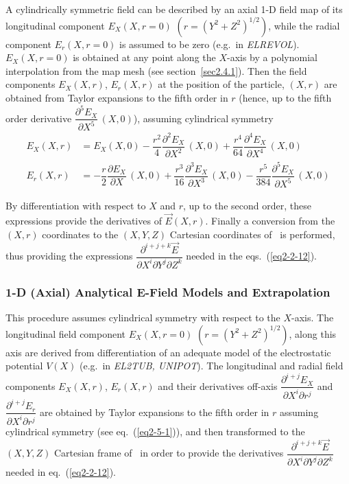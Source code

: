  A cylindrically symmetric field can be described by an 
axial 1-D field map of its longitudinal component $ E_X(X,r=0)$ 
$(r=(Y^2+Z^2)^{1/2})$,  
while the radial component $ E_r(X,r=0) $ is assumed to be zero 
(e.g.~in \textsl{ELREVOL}). $ E_X(X,r=0) $ is obtained at any point along the $ X$-axis by
a polynomial interpolation from the map mesh (see section~\ref{sec2.4.1}). Then the 
field components $ E_X(X,r)$,  $ E_r(X,r) $ at the position of the particle, 
$(X,r) $ are obtained from Taylor expansions to the fifth order in $ r $ (hence, up to 
the fifth order derivative 
$  \dfrac{ \partial^5 E_X }{ \partial X^5}\, (X,0)$),  assuming cylindrical symmetry 
% 
 \begin{equation}
	 \begin{aligned}
		 E_X (X,r)
		   &  =    E_X (X,0) - \dfrac{r^2 }{ 4} \dfrac{\partial^2 E_X }{ \partial X^2} \,(X,0)
		      + \dfrac{r^4 }{64} \dfrac{\partial^4 E_X }{ \partial X^4} \,(X,0)\\
		E_r(X,r)
		   & =   - \dfrac{r }{ 2} \dfrac{\partial E_X }{ \partial X}\, (X,0) 
		     + \dfrac{r^3 }{ 16} \dfrac{\partial^3 E_X }{ \partial X^3} \,(X,0)
		     - \dfrac{r^5 }{ 384} \dfrac{\partial^5 E_X }{ \partial X^5} \,(X,0)
	 \end{aligned}
 	\label{eq2-5-1}
 \end{equation}
\newpage %

\noindent By differentiation with respect to $ X $ and $ r$,  up to the second
order, these expressions provide the derivatives of $ \vec  E(X,r)$.  Finally a conversion
from the $ (X,r) $ coordinates to the $ (X,Y,Z) $ Cartesian coordinates of 
\zgou\ is performed, thus providing the expressions 
$  \dfrac{ \partial^{i+j+k} \vec  E }{ \partial X^i\partial Y^j\partial Z^k} $ 
needed in the eqs.~(\ref{eq2-2-12}). 



\subsubsection{1-D (Axial) Analytical E-Field Models and Extrapolation} \label{sec2.5.2}


This procedure assumes cylindrical symmetry with respect to the $ X$-axis.
 The longitudinal field component $ E_X(X,r=0) $ $ (r=(Y^2+Z^2)^{1/2}) $,
along this axis are derived from differentiation of an adequate 
model of the electrostatic potential $ V(X) $ (e.g.~in \textsl{EL2TUB, 
UNIPOT}). 
The longitudinal and radial field components $ E_X(X,r)$,  $ E_r(X,r) $ and 
their derivatives off-axis 
$  \dfrac{ \partial^{i+j}E_X }{ \partial X^i\partial r^j} $ and 
$  \dfrac{ \partial^{ i+j} E_r }{ \partial X^i\partial r^j} $  are obtained by 
Taylor expansions to the fifth order in $ r $ assuming cylindrical 
symmetry (see eq.~(\ref{eq2-5-1})), and then transformed to the $ (X,Y,Z) $ 
Cartesian frame of \zgou\ in order to provide the derivatives 
$ \dfrac{ \partial^{i+j+k} \vec  E }{ \partial X^i\partial Y^j\partial Z^k} $ 
needed in eq.~(\ref{eq2-2-12}).



